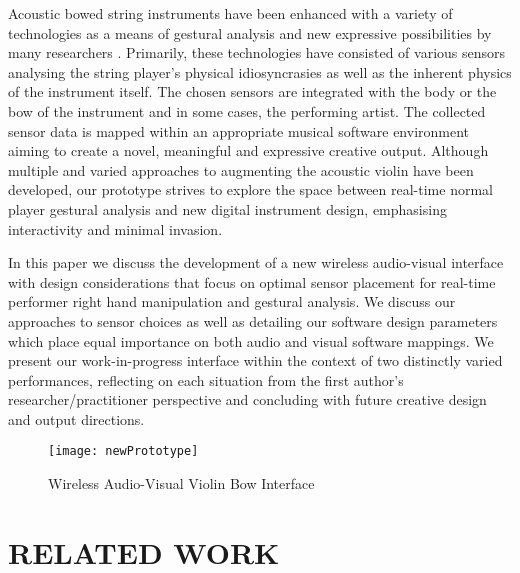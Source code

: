 \documentclass{nime-alternate}
\begin{document}
Acoustic bowed string instruments have been enhanced with a variety of technologies as a means of gestural analysis and new expressive possibilities by many researchers\cite{overholt:advancements} \cite{young:hyperbow} \cite{bevilacqua:augmented} \cite{machover:hyperinstrument} \cite{rose:interactive} \cite{kimura:extracting}. Primarily, these technologies have consisted of various sensors analysing the string player's physical idiosyncrasies as well as the inherent physics of the instrument itself\cite{overholt:musical}\cite{miranda:new}. The chosen sensors are integrated with the body or the bow of the instrument and in some cases, the performing artist\cite{reid:women}\cite{van:musicjacket}. The collected sensor data is mapped within an appropriate musical software environment aiming to create a novel, meaningful and expressive creative output. Although multiple and varied approaches to augmenting the acoustic violin have been developed, our prototype strives to explore the space between real-time normal player gestural analysis and new digital instrument design, emphasising interactivity and minimal invasion.

In this paper we discuss the development of a new wireless audio-visual interface with design considerations that focus on optimal sensor placement for real-time performer right hand manipulation and gestural analysis.
We discuss our approaches to sensor choices as well as detailing our software design parameters which place equal importance on both audio and visual software mappings. We present our work-in-progress interface within the context of two distinctly varied performances, reflecting on each situation from the first author's researcher/practitioner perspective and concluding with future creative design and output directions.

\begin{figure}[t]
	\centering
		\texttt{[image: newPrototype]}
	\caption{Wireless Audio-Visual Violin Bow Interface}
	\label{fig:newPrototype}
\end{figure}


\newpage
\section{RELATED WORK}
\end{document}
